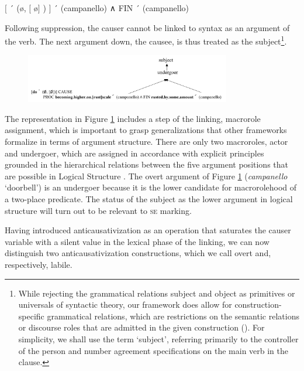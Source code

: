\documentclass[output=paper,colorlinks,citecolor=brown
]{langscibook}
\begin{document}
\ea  \label{bentley_example_50}
    $\lbrack$ ´ (\o, $\lbrack$ \o $\rbrack$ ) $\rbrack$ ´ (campanello) ∧ FIN ´ (campanello)
\z

Following suppression, the causer cannot be linked to syntax as an argument of the verb. The next argument down, the causee, is thus treated as the subject\footnote{While rejecting the grammatical relations subject and object as primitives or universals of syntactic theory, our framework does allow for construction-specific grammatical relations, which are restrictions on the semantic relations or discourse roles that are admitted in the given construction (\cites[242—309]{vanvalin2023principles}{lapolla2023grammatical}). For simplicity, we shall use the term ‘subject’, referring primarily to the controller of the person and number agreement specifications on the main verb in the clause.}.

\begin{figure}
\centering
\includegraphics[width=0.8\textwidth]{figures/bentley_figure3.png}
\caption{}
\label{fig:bentley_figure_3}
\end{figure}    


The representation in Figure \ref{fig:bentley_figure_3} includes a step of the linking, macrorole assignment, which is important to grasp generalizations that other frameworks formalize in terms of argument structure. There are only two macroroles, actor and undergoer, which are assigned in accordance with explicit principles grounded in the hierarchical relations between the five argument positions that are possible in Logical Structure \citep[82—198]{vanvalin1997syntax}. The overt argument of Figure \ref{fig:bentley_figure_3} (\textit{campanello} ‘doorbell’) is an undergoer because it is the lower candidate for macrorolehood of a two-place predicate. The status of the subject as the lower argument in logical structure will turn out to be relevant to \textsc{se} marking. 

Having introduced anticausativization as an operation that saturates the causer variable with a silent value in the lexical phase of the linking, we can now distinguish two anticausativization constructions, which we call overt and, respectively, labile. 
\end{document}
